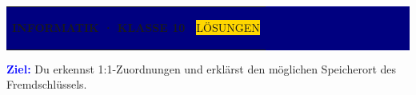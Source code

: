 \documentclass[10pt,a4paper]{article}
\begin{document}
\colorbox{Navy}{\parbox{\dimexpr\linewidth-2\fboxsep\relax}{%
  \vspace{3mm}\color{white}\begin{tabularx}{\linewidth}{@{}Xr@{}}
  {\small\bfseries INFORMATIK · KLASSE 10} & \colorbox{Gold}{\color{Navy}\small\bfseries\strut LÖSUNGEN}\end{tabularx}
  \par
  \vspace{0.8mm}{\large Sicherungsblatt}\vspace{2.8mm}}}
\vspace{2.5mm}
\colorbox{Sky}{\parbox{\dimexpr\linewidth-2\fboxsep\relax}{\vspace{1.6mm}
\textcolor{Blue}{\bfseries Ziel:} Du erkennst 1:1-Zuordnungen und erklärst den möglichen Speicherort des Fremdschlüssels.\vspace{1.6mm}}}
\end{document}
